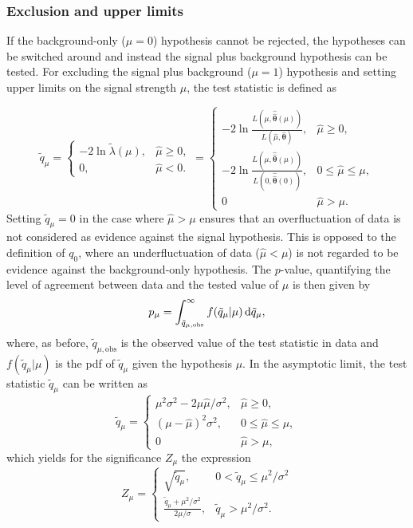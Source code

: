 \subsubsection{Exclusion and upper limits}
If the background-only ($\mu = 0$) hypothesis cannot be rejected, the hypotheses can be switched around and instead the signal plus background hypothesis can be tested. For excluding the signal plus background ($\mu = 1$) hypothesis and setting upper limits on the signal strength $\mu$, the test statistic is defined as

\begin{equation}
	\tilde{q}_\mu = 
\begin{cases}
    -2\ln{\tilde{\lambda}(\mu)}, & \hat{\mu} \geq 0,\\
    0,              & \hat{\mu} < 0.
\end{cases} =
\begin{cases}
    -2 \ln{\frac{L(\mu,\boldsymbol{\hat{\hat{\theta}}}(\mu))}{L(\hat{\mu},\hat{\boldsymbol{\theta}})}}, & \hat{\mu} \geq 0,\\
    -2 \ln{\frac{L(\mu,\boldsymbol{\hat{\hat{\theta}}}(\mu))}{L(0,\boldsymbol{\hat{\hat{\theta}}}(0))}},              & 0 \leq \hat{\mu} \leq \mu, \\
    0  & \hat{\mu} > \mu.
\end{cases}
\end{equation}
Setting $\tilde{q}_\mu = 0$ in the case where $\hat{\mu} > \mu$ ensures that an overfluctuation of data is not considered as evidence against the signal hypothesis. This is opposed to the definition of $q_0$, where an underfluctuation of data ($\hat{\mu} < \mu$) is not regarded to be evidence against the background-only hypothesis. The $p$-value, quantifying the level of agreement between data and the tested value of $\mu$ is then given by
\begin{equation}
		p_\mu = \int_{\tilde{q}_{\mu,\mathrm{obs}}}^{\infty}{f(\tilde{q}_\mu\vert \mu)\mathop{}\!\mathrm{d} \tilde{q}_\mu},
\end{equation}
where, as before, $\tilde{q}_{\mu,\mathrm{obs}}$ is the observed value of the test statistic in data and $f(\tilde{q}_\mu\vert \mu)$ is the \gls{pdf} of $\tilde{q}_\mu$ given the hypothesis $\mu$. In the asymptotic limit, the test statistic $\tilde{q}_\mu$ can be written as
\begin{equation}
	\tilde{q}_\mu = 
\begin{cases}
    \mu^2\sigma^2 - 2\mu\hat{\mu}/\sigma^2, & \hat{\mu} \geq 0,\\
    (\mu-\hat{\mu})^2\sigma^2,              & 0 \leq \hat{\mu} \leq \mu, \\
    0  & \hat{\mu} > \mu,
\end{cases}
\end{equation}
which yields for the significance $Z_\mu$ the expression
\begin{equation}
	Z_\mu = 
\begin{cases}
    \sqrt{\tilde{q}_\mu}, & 0 < \tilde{q}_\mu \leq \mu^2/\sigma^2 \\
    \frac{\tilde{q}_\mu + \mu^2/\sigma^2}{2\mu/\sigma},              & \tilde{q}_\mu > \mu^2/\sigma^2 .
\end{cases}
\end{equation}


